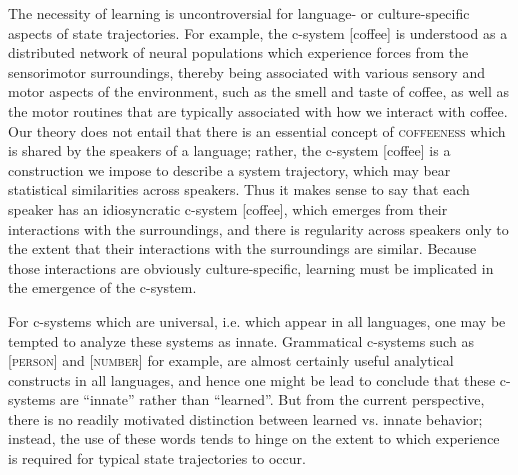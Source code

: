 The necessity of learning is uncontroversial for language- or culture-specific aspects of state trajectories. For example, the c-system [coffee] is understood as a distributed network of neural populations which experience forces from the sensorimotor surroundings, thereby being associated with various sensory and motor aspects of the environment, such as the smell and taste of coffee, as well as the motor routines that are typically associated with how we interact with coffee. Our theory does not entail that there is an essential concept of \textsc{coffeeness} which is shared by the speakers of a language; rather, the c-system [coffee] is a construction we impose to describe a system trajectory, which may bear statistical similarities across speakers. Thus it makes sense to say that each speaker has an idiosyncratic c-system [coffee], which emerges from their interactions with the surroundings, and there is regularity across speakers only to the extent that their interactions with the surroundings are similar. Because those interactions are obviously culture-specific, learning must be implicated in the emergence of the c-system.

For c-systems which are universal, i.e. which appear in all languages, one may be tempted to analyze these systems as innate. Grammatical c-systems such as [\textsc{person}] and [\textsc{number}] for example, are almost certainly useful analytical constructs in all languages, and hence one might be lead to conclude that these c-systems are “innate” rather than “learned”. But from the current perspective, there is no readily motivated distinction between learned vs. innate behavior; instead, the use of these words tends to hinge on the extent to which experience is required for typical state trajectories to occur. 

